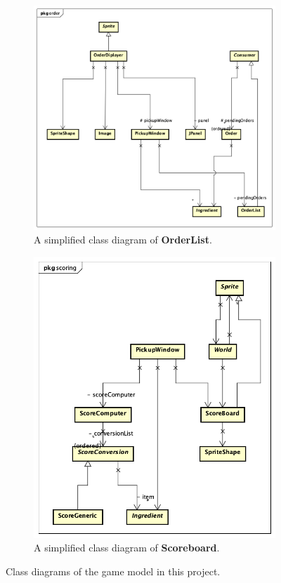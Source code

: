 \begin{figure}[h!]
\begin{subfigure}{.5\textwidth}
\centering
  \includegraphics[width=.9\linewidth]{Order_Class_Diagram}  
  \caption{A simplified class diagram of \textbf{OrderList}.}
  \label{fig:sub-first}
\end{subfigure}
\begin{subfigure}{.5\textwidth}
  \centering
  \includegraphics[width=.9\linewidth]{Score_Class_Diagram}  
  \caption{A simplified class diagram of \textbf{Scoreboard}.}
  \label{fig:sub-second}
\end{subfigure}
\caption{Class diagrams of the game model in this project.}
\end{figure}
